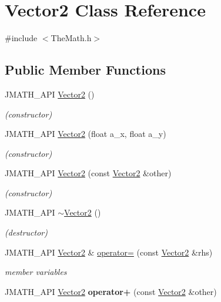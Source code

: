 \hypertarget{class_vector2}{\section{Vector2 Class Reference}
\label{class_vector2}
}


{\ttfamily \#include $<$The\+Math.\+h$>$}

\subsection*{Public Member Functions}
\begin{DoxyCompactItemize}
\item 
J\+M\+A\+T\+H\+\_\+\+A\+P\+I \hyperlink{class_vector2_a22104d1809be26a419ef1f959e3761bf}{Vector2} ()
\begin{DoxyCompactList}\small\item\em (constructor) \end{DoxyCompactList}\item 
J\+M\+A\+T\+H\+\_\+\+A\+P\+I \hyperlink{class_vector2_a8b501ac222e68dc79cf63ce3f87af50a}{Vector2} (float a\+\_\+x, float a\+\_\+y)
\begin{DoxyCompactList}\small\item\em (constructor) \end{DoxyCompactList}\item 
\hypertarget{class_vector2_ac0c70e89b089fb619dae62c32ccde4ec}{J\+M\+A\+T\+H\+\_\+\+A\+P\+I \hyperlink{class_vector2_ac0c70e89b089fb619dae62c32ccde4ec}{Vector2} (const \hyperlink{class_vector2}{Vector2} \&other)}\label{class_vector2_ac0c70e89b089fb619dae62c32ccde4ec}

\begin{DoxyCompactList}\small\item\em (constructor) \end{DoxyCompactList}\item 
\hypertarget{class_vector2_ada03f5433d3ca4841d5ebb90b167202e}{J\+M\+A\+T\+H\+\_\+\+A\+P\+I \hyperlink{class_vector2_ada03f5433d3ca4841d5ebb90b167202e}{$\sim$\+Vector2} ()}\label{class_vector2_ada03f5433d3ca4841d5ebb90b167202e}

\begin{DoxyCompactList}\small\item\em (destructor) \end{DoxyCompactList}\item 
J\+M\+A\+T\+H\+\_\+\+A\+P\+I \hyperlink{class_vector2}{Vector2} \& \hyperlink{class_vector2_a694d40fe4dd8a86968b1a8d48b3a1c3f}{operator=} (const \hyperlink{class_vector2}{Vector2} \&rhs)
\begin{DoxyCompactList}\small\item\em member variables \end{DoxyCompactList}\item 
\hypertarget{class_vector2_ac79cde6f9b629b09416d74e3832baa69}{J\+M\+A\+T\+H\+\_\+\+A\+P\+I \hyperlink{class_vector2}{Vector2} {\bfseries operator+} (const \hyperlink{class_vector2}{Vector2} \&other)}\label{class_vector2_ac79cde6f9b629b09416d74e3832baa69}


\end{DoxyCompactItemize}
